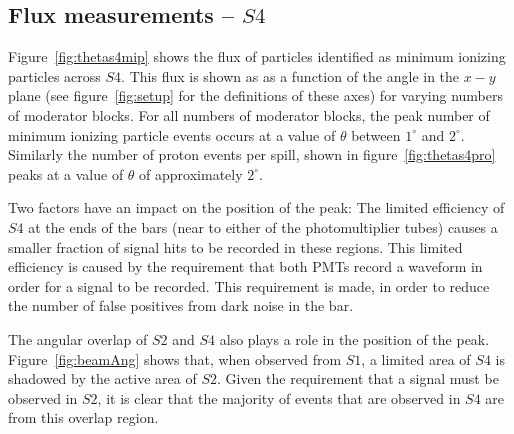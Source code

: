 	\subsection{Flux measurements -- $S4$}

   
	Figure~\ref{fig:thetas4mip} shows the flux of particles identified as minimum ionizing particles across $S4$.
	This flux is shown as as a function of the angle in the $x-y$ plane (see figure~\ref{fig:setup} for the definitions of these axes) for varying numbers of moderator blocks.
	For all numbers of moderator blocks, the peak number of minimum ionizing particle events occurs at a value of $\theta$ between $1^{\circ}$ and $2^{\circ}$.
	Similarly the number of proton events per spill, shown in figure~\ref{fig:thetas4pro} peaks at a value of $\theta$ of approximately $2^{\circ}$.
	
	Two factors have an impact on the position of the peak:
	The limited efficiency of $S4$ at the ends of the bars (near to either of the photomultiplier tubes) causes a smaller fraction of signal hits to be recorded in these regions. 
	This limited efficiency is caused by the requirement that both PMTs record a waveform in order for a signal to be recorded.
	This requirement is made, in order to reduce the number of false positives from dark noise in the bar.
	
	The angular overlap of $S2$ and $S4$ also plays a role in the position of the peak. 
	Figure~\ref{fig:beamAng} shows that, when observed from $S1$, a limited area of $S4$ is shadowed by the active area of $S2$.
	Given the requirement that a signal must be observed in $S2$, it is clear that the majority of events that are observed in $S4$ are from this overlap region.
   
